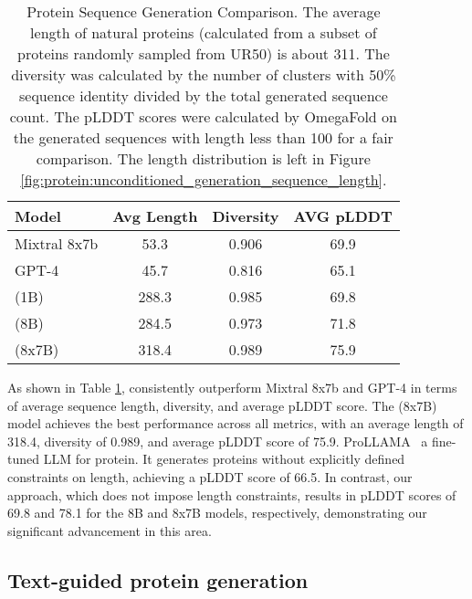 \begin{table}[!h]
\centering
\begin{tabular}{lccc}
\toprule
Model & Avg Length & Diversity & AVG pLDDT \\
\midrule
Mixtral 8x7b & 53.3 & 0.906 & 69.9 \\
GPT-4 & 45.7 & 0.816 & 65.1 \\
\midrule
\ourM{} (1B) & 288.3 & 0.985 & 69.8 \\
\ourM{} (8B) & 284.5 & 0.973 & 71.8 \\
\ourM{} (8x7B) & 318.4 & 0.989 & 75.9 \\
\bottomrule
\end{tabular}
\caption{Protein Sequence Generation Comparison. The average length of natural proteins (calculated from a subset of proteins randomly sampled from UR50) is about 311. The diversity was calculated by the number of clusters with 50\% sequence identity divided by the total generated sequence count. The pLDDT scores were calculated by OmegaFold \cite{omegafold} on the generated sequences with length less than 100 for a fair comparison. The length distribution is left in Figure \ref{fig:protein:unconditioned_generation_sequence_length}. }
\label{tab:protein:unconditioned_generation}
\end{table}

As shown in Table \ref{tab:protein:unconditioned_generation}, \ourM{} consistently outperform Mixtral 8x7b and GPT-4 in terms of average sequence length, diversity, and average pLDDT score. The \ourM{} (8x7B) model achieves the best performance across all metrics, with an average length of 318.4, diversity of 0.989, and average pLDDT score of 75.9. ProLLAMA~\cite{lv2024prollamaproteinlanguagemodel} a fine-tuned LLM for protein. It generates proteins without explicitly defined constraints on length, achieving a pLDDT score of 66.5. In contrast, our approach, which does not impose length constraints, results in pLDDT scores of 69.8 and 78.1 for the 8B and 8x7B models, respectively, demonstrating our significant advancement in this area.



\subsection{Text-guided protein generation}\label{sec:text_guided_protein_design}


